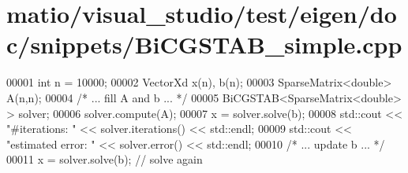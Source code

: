 \hypertarget{matio_2visual__studio_2test_2eigen_2doc_2snippets_2_bi_c_g_s_t_a_b__simple_8cpp_source}{}\section{matio/visual\+\_\+studio/test/eigen/doc/snippets/\+Bi\+C\+G\+S\+T\+A\+B\+\_\+simple.cpp}
\label{matio_2visual__studio_2test_2eigen_2doc_2snippets_2_bi_c_g_s_t_a_b__simple_8cpp_source}

\begin{DoxyCode}
00001   \textcolor{keywordtype}{int} n = 10000;
00002   VectorXd x(n), b(n);
00003   SparseMatrix<double> A(n,n);
00004   \textcolor{comment}{/* ... fill A and b ... */} 
00005   BiCGSTAB<SparseMatrix<double> > solver;
00006   solver.compute(A);
00007   x = solver.solve(b);
00008   std::cout << \textcolor{stringliteral}{"#iterations:     "} << solver.iterations() << std::endl;
00009   std::cout << \textcolor{stringliteral}{"estimated error: "} << solver.error()      << std::endl;
00010   \textcolor{comment}{/* ... update b ... */}
00011   x = solver.solve(b); \textcolor{comment}{// solve again}
\end{DoxyCode}
